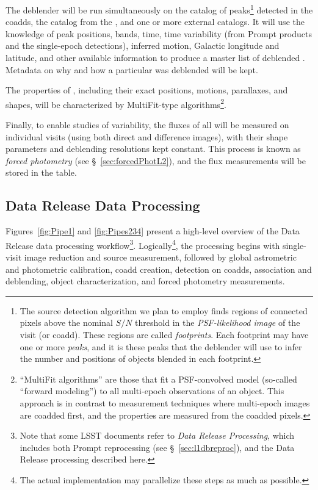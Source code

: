 \documentclass[SE,lsstdraft,toc]{lsstdoc}
\begin{document}
The deblender will be run simultaneously on the catalog of peaks\footnote{The source detection algorithm we plan to employ finds regions of connected pixels above the nominal $S/N$ threshold in the \emph{PSF-likelihood image} of the visit (or coadd). These regions are called \emph{footprints}. Each footprint may have one or more \emph{peaks}, and it is these peaks that the deblender will use to infer the number and positions of objects blended in each footprint.} detected in the coadds, the \DIAObject catalog from the \PPDB, and one or more external catalogs.  It will use the knowledge of peak positions, bands, time, time variability (from Prompt products and the single-epoch \Source detections), inferred motion, Galactic longitude and latitude, and other available information to produce a master list of deblended \Objects. Metadata on why and how a particular \Object was deblended will be kept.

The properties of \Objects, including their exact positions, motions, parallaxes, and shapes, will be characterized by MultiFit-type algorithms\footnote{``MultiFit algorithms'' are those that fit a PSF-convolved model (so-called ``forward modeling'')  to all multi-epoch observations of an object. This approach is in contrast to measurement techniques where multi-epoch images are coadded first, and the properties are measured from the coadded pixels.}.

Finally, to enable studies of variability, the fluxes of all \Objects will be measured on individual visits (using both
direct and difference images), with their shape parameters and deblending resolutions kept constant. This process is known as \emph{forced photometry} (see \S~\ref{sec:forcedPhotL2}), and the flux measurements will be stored in the \ForcedSource table.

\subsection{Data Release Data Processing}
\label{sec:level2dp}


Figures~\ref{fig:Pipe1} and \ref{fig:Pipes234}
present a high-level overview of the Data Release data processing workflow\footnote{Note that some LSST documents refer to \emph{Data Release Processing}, which includes both Prompt reprocessing (see \S~\ref{sec:l1dbreproc}), and the Data Release processing described here.}. Logically\footnote{The actual implementation may parallelize these steps as much as possible.}, the processing begins with single-visit image reduction and source measurement, followed by global astrometric and photometric calibration, coadd creation, detection on coadds, association and deblending, object characterization, and forced photometry measurements.
\end{document}
